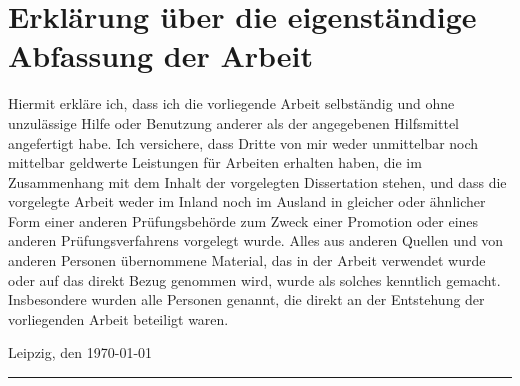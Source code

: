 \clearpage
\thispagestyle{empty}

\section*{Erklärung über die eigenständige Abfassung der Arbeit}

Hiermit erkläre ich, dass ich die vorliegende Arbeit selbständig und ohne unzulässige Hilfe
oder Benutzung anderer als der angegebenen Hilfsmittel angefertigt habe. Ich versichere,
dass Dritte von mir weder unmittelbar noch mittelbar geldwerte Leistungen für Arbeiten
erhalten haben, die im Zusammenhang mit dem Inhalt der vorgelegten Dissertation stehen,
und dass die vorgelegte Arbeit weder im Inland noch im Ausland in gleicher oder ähnlicher
Form einer anderen Prüfungsbehörde zum Zweck einer Promotion oder eines anderen
Prüfungsverfahrens vorgelegt wurde. Alles aus anderen Quellen und von anderen
Personen übernommene Material, das in der Arbeit verwendet wurde oder auf das direkt
Bezug genommen wird, wurde als solches kenntlich gemacht. Insbesondere wurden alle
Personen genannt, die direkt an der Entstehung der vorliegenden Arbeit beteiligt waren.

\vspace{4\baselineskip}

\begin{center}
\begin{minipage}[t]{0.48\textwidth}
Leipzig, den \today
\end{minipage} %
\begin{minipage}[t]{0.48\textwidth}
\vspace{0.1\baselineskip}
\rule{12em}{0.5pt} \\
\tAuthor
\end{minipage}
\end{center}

